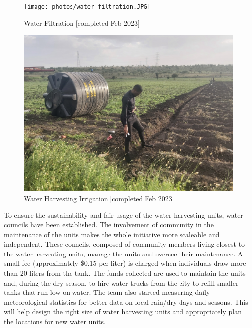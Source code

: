 \documentclass[10pt, twocolumn]{article}
\begin{document}
\begin{figure}
    \centering
    \texttt{[image: photos/water\_filtration.JPG]}
    \caption{Water Filtration [completed Feb 2023]}
    \label{fig:filtration_unit}
\end{figure}


\begin{figure}
    \centering
    \includegraphics[width=1\linewidth]{photos/Irrigation_Unit.jpg}
    \caption{Water Harvesting Irrigation [completed Feb 2023]}
    \label{fig:irrigation_unit}
\end{figure}

To ensure the sustainability and fair usage of the water harvesting units, water councils have been established. The involvement of community in the maintenance of the units makes the whole initiative more scaleable and independent. These councils, composed of community members living closest to the water harvesting units, manage the units and oversee their maintenance. A small fee (approximately \$0.15 per liter) is charged when individuals draw more than 20 liters from the tank. The funds collected are used to maintain the units and, during the dry season, to hire water trucks from the city to refill smaller tanks that run low on water. The team also started measuring daily meteorological statistics for better data on local rain/dry days and seasons. This will help design the right size of water harvesting units and appropriately plan the locations for new water units.
\end{document}
